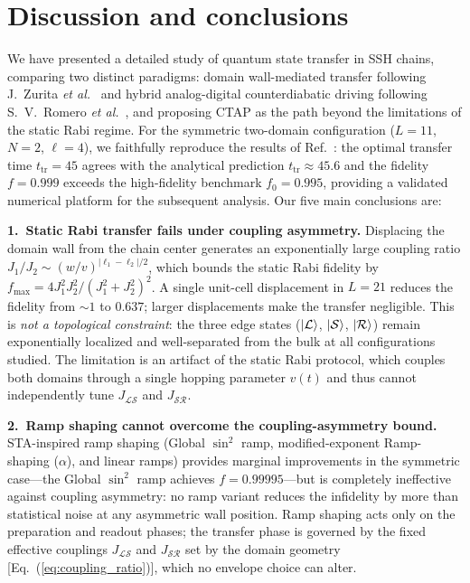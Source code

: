 \documentclass[
  reprint,
  amsmath,
  amssymb,
  aps,
  prb,
  floatfix,
  longbibliography,
]{revtex4-2}
\newcommand{\ttr}{t_{\mathrm{tr}}}
\newcommand{\JLS}{J_{\mathcal{LS}}}
\newcommand{\JSR}{J_{\mathcal{SR}}}
\newcommand{\ketL}{\ket{\mathcal{L}}}
\newcommand{\ketS}{\ket{\mathcal{S}}}
\newcommand{\ketR}{\ket{\mathcal{R}}}
\begin{document}
\section{Discussion and conclusions}
\label{sec:conclusions}

We have presented a detailed study of quantum state transfer in SSH chains,
comparing two distinct paradigms: domain wall-mediated transfer following
J.~Zurita \textit{et al.}~\cite{Zurita2023} and hybrid analog-digital
counterdiabatic driving following S.~V.~Romero \textit{et al.}~\cite{Romero2024},
and proposing CTAP as the path beyond the limitations of the static Rabi regime.
For the symmetric two-domain configuration ($L = 11$, $N = 2$, $\ell = 4$), we
faithfully reproduce the results of Ref.~\cite{Zurita2023}: the optimal transfer
time $\ttr = 45$ agrees with the analytical prediction $\ttr \approx 45.6$ and
the fidelity $f = 0.999$ exceeds the high-fidelity benchmark $f_0 = 0.995$,
providing a validated numerical platform for the subsequent analysis.
Our five main conclusions are:

\textbf{1.~Static Rabi transfer fails under coupling asymmetry.}
Displacing the domain wall from the chain center generates an exponentially
large coupling ratio $J_1/J_2 \sim (w/v)^{|\ell_1 - \ell_2|/2}$, which bounds
the static Rabi fidelity by $f_{\max} = 4J_1^2 J_2^2/(J_1^2 + J_2^2)^2$.
A single unit-cell displacement in $L = 21$ reduces the fidelity from
$\sim\!1$ to $0.637$; larger displacements make the transfer negligible.
This is \emph{not a topological constraint}: the three edge states
($\ketL$, $\ketS$, $\ketR$) remain exponentially localized and well-separated
from the bulk at all configurations studied. The limitation is an artifact of
the static Rabi protocol, which couples both domains through a single hopping
parameter $v(t)$ and thus cannot independently tune $\JLS$ and $\JSR$.

\textbf{2.~Ramp shaping cannot overcome the coupling-asymmetry bound.}
STA-inspired ramp shaping (Global $\sin^2$ ramp, modified-exponent
Ramp-shaping ($\alpha$), and linear ramps) provides marginal improvements
in the symmetric case---the Global $\sin^2$ ramp achieves $f = 0.99995$---but
is completely ineffective against coupling asymmetry: no ramp variant reduces
the infidelity by more than statistical noise at any asymmetric wall position.
Ramp shaping acts only on the preparation and readout phases; the transfer
phase is governed by the fixed effective couplings $\JLS$ and $\JSR$ set by
the domain geometry [Eq.~(\ref{eq:coupling_ratio})], which no envelope choice
can alter.
\end{document}
